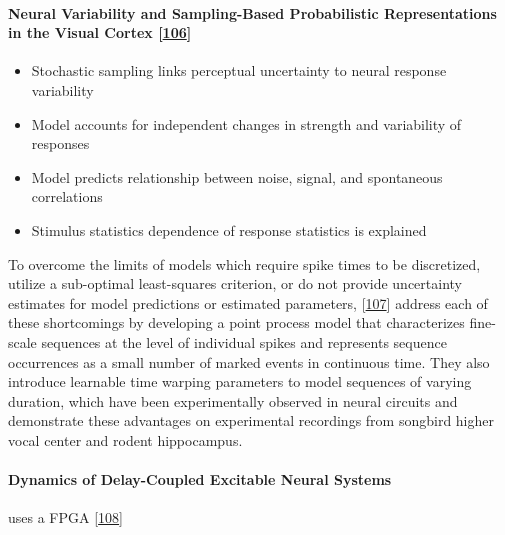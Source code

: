 \hypertarget{neural-variability-and-sampling-based-probabilistic-representations-in-the-visual-cortex-orban2016}{%
\paragraph{\texorpdfstring{Neural Variability and Sampling-Based Probabilistic Representations in the Visual Cortex {[}\protect\hyperlink{ref-1300cS9RL}{106}{]}}{Neural Variability and Sampling-Based Probabilistic Representations in the Visual Cortex {[}106{]}}}\label{neural-variability-and-sampling-based-probabilistic-representations-in-the-visual-cortex-orban2016}}

\begin{itemize}
\tightlist
\item
  Stochastic sampling links perceptual uncertainty to neural response variability
\item
  Model accounts for independent changes in strength and variability of responses
\item
  Model predicts relationship between noise, signal, and spontaneous correlations
\item
  Stimulus statistics dependence of response statistics is explained
\end{itemize}

To overcome the limits of models which require spike times to be discretized, utilize a sub-optimal least-squares criterion, or do not provide uncertainty estimates for model predictions or estimated parameters, {[}\protect\hyperlink{ref-1365b3Wwl}{107}{]} address each of these shortcomings by developing a point process model that characterizes fine-scale sequences at the level of individual spikes and represents sequence occurrences as a small number of marked events in continuous time. They also introduce learnable time warping parameters to model sequences of varying duration, which have been experimentally observed in neural circuits and demonstrate these advantages on experimental recordings from songbird higher vocal center and rodent hippocampus.

\hypertarget{dynamics-of-delay-coupled-excitable-neural-systems}{%
\paragraph{Dynamics of Delay-Coupled Excitable Neural Systems}\label{dynamics-of-delay-coupled-excitable-neural-systems}}

uses a FPGA
{[}\protect\hyperlink{ref-rYLmAESf}{108}{]}

